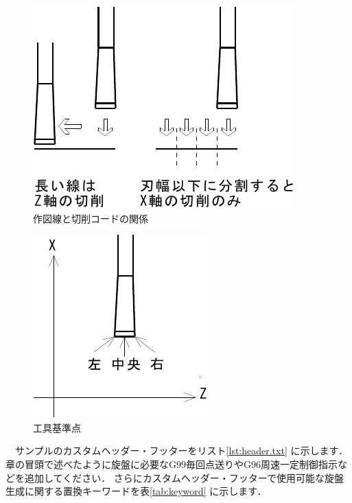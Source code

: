\begin{minipage}{0.6\textwidth}
\begin{figure}[H]
\centering
\includegraphics{No2/fig/groove1-crop.pdf}
\caption{作図線と切削コードの関係}
\label{fig:groove1.pdf}
\end{figure}
\end{minipage}
\begin{minipage}{0.4\textwidth}
\begin{figure}[H]
\centering
\includegraphics{No2/fig/groove2-crop.pdf}
\caption{工具基準点}
\label{fig:groove2.pdf}
\end{figure}
\end{minipage}

\vspace*{1zh}
　サンプルのカスタムヘッダー・フッターをリスト\ref{lst:header.txt} に示します．
章の冒頭で述べたように旋盤に必要なG99毎回点送りやG96周速一定制御指示などを追加してください．
さらにカスタムヘッダー・フッターで使用可能な旋盤生成に関する置換キーワードを表\ref{tab:keyword} に示します．

